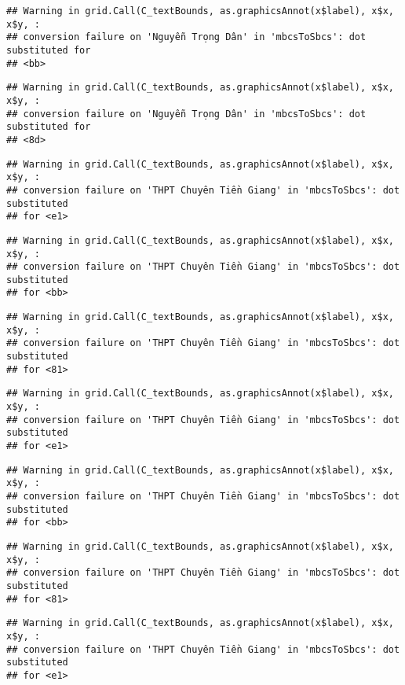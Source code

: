 \documentclass[
]{article}
\begin{document}
\begin{verbatim}
## Warning in grid.Call(C_textBounds, as.graphicsAnnot(x$label), x$x, x$y, :
## conversion failure on 'Nguyễn Trọng Dân' in 'mbcsToSbcs': dot substituted for
## <bb>
\end{verbatim}

\begin{verbatim}
## Warning in grid.Call(C_textBounds, as.graphicsAnnot(x$label), x$x, x$y, :
## conversion failure on 'Nguyễn Trọng Dân' in 'mbcsToSbcs': dot substituted for
## <8d>
\end{verbatim}

\begin{verbatim}
## Warning in grid.Call(C_textBounds, as.graphicsAnnot(x$label), x$x, x$y, :
## conversion failure on 'THPT Chuyên Tiền Giang' in 'mbcsToSbcs': dot substituted
## for <e1>
\end{verbatim}

\begin{verbatim}
## Warning in grid.Call(C_textBounds, as.graphicsAnnot(x$label), x$x, x$y, :
## conversion failure on 'THPT Chuyên Tiền Giang' in 'mbcsToSbcs': dot substituted
## for <bb>
\end{verbatim}

\begin{verbatim}
## Warning in grid.Call(C_textBounds, as.graphicsAnnot(x$label), x$x, x$y, :
## conversion failure on 'THPT Chuyên Tiền Giang' in 'mbcsToSbcs': dot substituted
## for <81>
\end{verbatim}

\begin{verbatim}
## Warning in grid.Call(C_textBounds, as.graphicsAnnot(x$label), x$x, x$y, :
## conversion failure on 'THPT Chuyên Tiền Giang' in 'mbcsToSbcs': dot substituted
## for <e1>
\end{verbatim}

\begin{verbatim}
## Warning in grid.Call(C_textBounds, as.graphicsAnnot(x$label), x$x, x$y, :
## conversion failure on 'THPT Chuyên Tiền Giang' in 'mbcsToSbcs': dot substituted
## for <bb>
\end{verbatim}

\begin{verbatim}
## Warning in grid.Call(C_textBounds, as.graphicsAnnot(x$label), x$x, x$y, :
## conversion failure on 'THPT Chuyên Tiền Giang' in 'mbcsToSbcs': dot substituted
## for <81>
\end{verbatim}

\begin{verbatim}
## Warning in grid.Call(C_textBounds, as.graphicsAnnot(x$label), x$x, x$y, :
## conversion failure on 'THPT Chuyên Tiền Giang' in 'mbcsToSbcs': dot substituted
## for <e1>
\end{verbatim}
\end{document}
